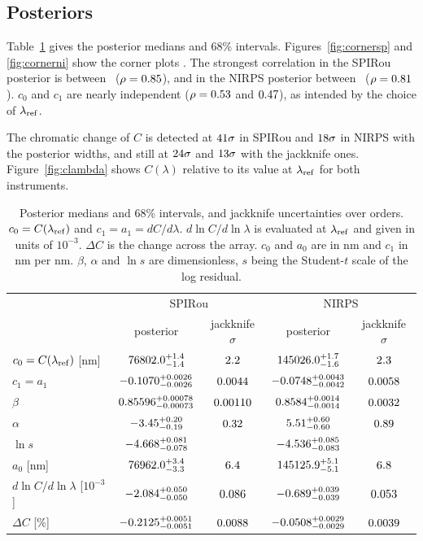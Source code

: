 \documentclass[11pt,a4paper]{article}
\begin{document}
\subsection{Posteriors}

Table~\ref{tab:posterior} gives the posterior medians and 68\% intervals. Figures~\ref{fig:cornersp} and \ref{fig:cornerni} show the corner plots \citep{ForemanMackey2016}. The strongest correlation in the SPIRou posterior is between \spCorrPair\ ($\rho=0.85$), and in the NIRPS posterior between \niCorrPair\ ($\rho=0.81$). $c_0$ and $c_1$ are nearly independent ($\rho=0.53$ and $0.47$), as intended by the choice of $\lambda_{\rm ref}$.

The chromatic change of $C$ is detected at $41\sigma$ in SPIRou and $18\sigma$ in NIRPS with the posterior widths, and still at $24\sigma$ and $13\sigma$ with the jackknife ones. Figure~\ref{fig:clambda} shows $C(\lambda)$ relative to its value at $\lambda_{\rm ref}$ for both instruments.

\begin{table}[t]
\centering
\caption{Posterior medians and 68\% intervals, and jackknife uncertainties over orders. $c_0 = C(\lambda_{\rm ref})$ and $c_1 = a_1 = dC/d\lambda$. $d\ln C/d\ln\lambda$ is evaluated at $\lambda_{\rm ref}$ and given in units of $10^{-3}$. $\Delta C$ is the change across the array. $c_0$ and $a_0$ are in nm and $c_1$ in nm per nm. $\beta$, $\alpha$ and $\ln s$ are dimensionless, $s$ being the Student-$t$ scale of the log residual.}
\label{tab:posterior}
\small
\begin{tabular}{lcccc}
\toprule
 & \multicolumn{2}{c}{SPIRou} & \multicolumn{2}{c}{NIRPS} \\
 & posterior & jackknife $\sigma$ & posterior & jackknife $\sigma$ \\
\midrule
$c_0 = C(\lambda_{\rm ref})$ [nm] & $76802.0^{+1.4}_{-1.4}$ & $2.2$ & $145026.0^{+1.7}_{-1.6}$ & $2.3$ \\
$c_1 = a_1$ & $-0.1070^{+0.0026}_{-0.0026}$ & $0.0044$ & $-0.0748^{+0.0043}_{-0.0042}$ & $0.0058$ \\
$\beta$ & $0.85596^{+0.00078}_{-0.00073}$ & $0.00110$ & $0.8584^{+0.0014}_{-0.0014}$ & $0.0032$ \\
$\alpha$ & $-3.45^{+0.20}_{-0.19}$ & $0.32$ & $5.51^{+0.60}_{-0.60}$ & $0.89$ \\
$\ln s$ & $-4.668^{+0.081}_{-0.078}$ & & $-4.536^{+0.085}_{-0.083}$ & \\
\midrule
$a_0$ [nm] & $76962.0^{+3.4}_{-3.3}$ & $6.4$ & $145125.9^{+5.1}_{-5.1}$ & $6.8$ \\
$d\ln C/d\ln\lambda$ [$10^{-3}$] & $-2.084^{+0.050}_{-0.050}$ & $0.086$ & $-0.689^{+0.039}_{-0.039}$ & $0.053$ \\
$\Delta C$ [\%] & $-0.2125^{+0.0051}_{-0.0051}$ & $0.0088$ & $-0.0508^{+0.0029}_{-0.0029}$ & $0.0039$ \\
\bottomrule
\end{tabular}
\end{table}
\end{document}
